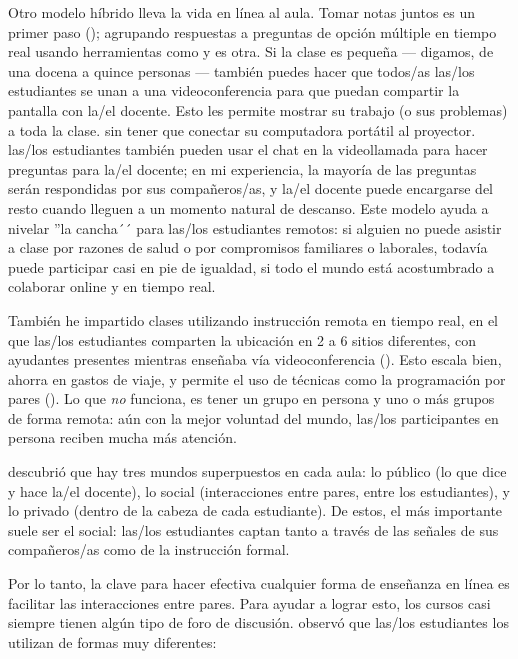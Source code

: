 Otro modelo híbrido lleva la vida en línea al aula.
Tomar notas juntos es un primer paso ();
agrupando respuestas a preguntas de opción múltiple en tiempo real
usando herramientas como 
y  es otra.
Si la clase es pequeña --- digamos, de una docena a quince personas --- también puedes
hacer que todos/as las/los estudiantes se unan a una videoconferencia
para que puedan compartir la pantalla con la/el docente.
Esto les permite mostrar su trabajo (o sus problemas) a toda la clase.
sin tener que conectar su computadora portátil al proyector.
las/los estudiantes también pueden usar el chat en la videollamada para hacer preguntas para la/el docente;
en mi experiencia,
la mayoría de las preguntas serán respondidas por sus compañeros/as,
y la/el docente puede encargarse del resto cuando lleguen a un momento natural de descanso.
Este modelo ayuda a nivelar ''la cancha´´ para las/los estudiantes remotos:
si alguien no puede asistir a clase por razones de salud
o por compromisos familiares o laborales,
todavía puede participar casi en pie de igualdad,
si todo el mundo está acostumbrado a colaborar online y en tiempo real.

También he impartido clases utilizando instrucción remota en tiempo real,
en el que las/los estudiantes comparten la ubicación en 2 a 6 sitios diferentes, con ayudantes presentes
mientras enseñaba vía videoconferencia ().
Esto escala bien,
ahorra en gastos de viaje,
y permite el uso de técnicas como la programación por pares ().
Lo que \emph{no} funciona, es tener un grupo en persona y uno o más grupos de forma remota:
aún con la mejor voluntad del mundo,
las/los participantes en persona reciben mucha más atención.


\cite{Nuth2007} descubrió que hay tres mundos superpuestos en cada aula:
lo público (lo que dice y hace la/el docente),
lo social (interacciones entre pares, entre los estudiantes),
y lo privado (dentro de la cabeza de cada estudiante).
De estos,
el más importante suele ser el social:
las/los estudiantes captan tanto a través de las señales de sus compañeros/as como de la instrucción formal.

Por lo tanto, la clave para hacer efectiva cualquier forma de enseñanza en línea es
facilitar las interacciones entre pares.
Para ayudar a lograr esto,
los cursos casi siempre tienen algún tipo de foro de discusión.
\cite{Mill2016a} observó que las/los estudiantes los utilizan de formas muy diferentes:

